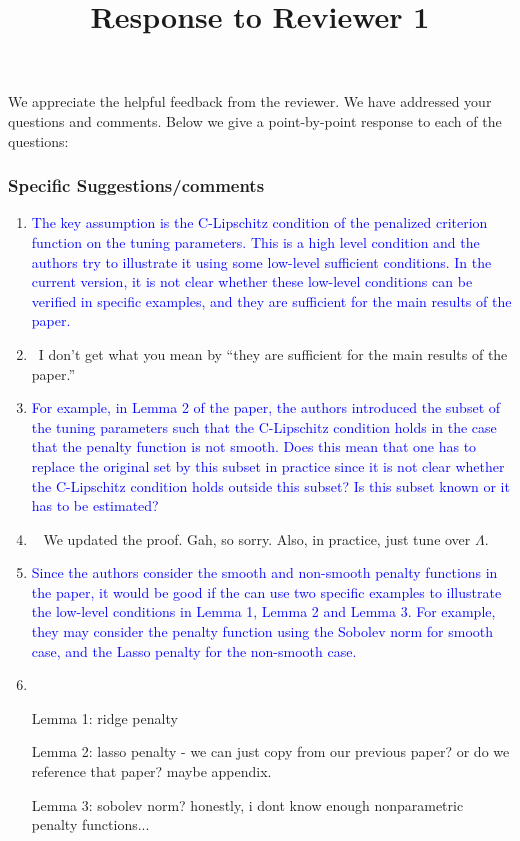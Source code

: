\documentclass[]{article}
\title{Response to Reviewer 1}
\newcommand{\point}[1]{\item \textcolor{blue}{#1}}
\newcommand{\reply}{\item[]\ }
\begin{document}
	
	\maketitle
	
	We appreciate the helpful feedback from the reviewer. We have addressed your questions and comments. Below we give a point-by-point response to each of the questions:
	
	\subsubsection*{Specific Suggestions/comments}
	
	\begin{enumerate}
		\point{
			The key assumption is the C-Lipschitz condition of the penalized criterion function on the tuning parameters.  This is a high level condition and the authors try to illustrate it using some low-level sufficient conditions.
			In the current version, it is not clear whether these low-level conditions can be verified in specific examples, and they are sufficient for the main results of the paper.
		}
		\reply{I don't get what you mean by ``they are sufficient for the main results of the paper.''}
		
		\point{
			For example, in Lemma 2 of the paper, the authors introduced the subset of the tuning parameters such that the C-Lipschitz condition holds in the case that the penalty function is not smooth.
			Does this mean that one has to replace the original set by this subset in practice since it is not clear whether the C-Lipschitz condition holds outside this subset?
			Is this subset known or it has to be estimated?
		}
		\reply{
			We updated the proof. Gah, so sorry.
			Also, in practice, just tune over $\Lambda$.
		}
	
		\point{
			Since the authors consider the smooth and non-smooth penalty functions in the paper, it would be good if the can use two specific examples to illustrate the low-level conditions in Lemma 1, Lemma 2 and Lemma 3. For example, they may consider the penalty function using the Sobolev norm for smooth case, and the Lasso penalty for the non-smooth case.
		}
	
		\reply{
		
			Lemma 1: ridge penalty
		
			Lemma 2: lasso penalty - we can just copy from our previous paper? or do we reference that paper? maybe appendix.
			
			Lemma 3: sobolev norm? honestly, i dont know enough nonparametric penalty functions...
			
}
\end{enumerate}
\end{document}
